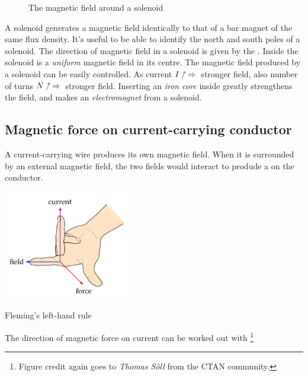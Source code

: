 \begin{figure}[htp]
	\caption{The magnetic field around a solenoid}
\end{figure}

A solenoid generates a magnetic field identically to that of a bar magnet of the same flux density. It's useful to be able to identify the north and south poles of a solenoid. The direction of magnetic field in a solenoid is given by the . Inside the solenoid is a \emph{uniform} magnetic field in its centre. The magnetic field produced by a solenoid can be easily controlled. As current $I\nnearrow \, \Rightarrow \, $ stronger field, also number of turns $N\nnearrow\, \Rightarrow \, $ stronger field. Inserting an \emph{iron core} inside greatly strengthens the field, and  makes an \emph{electromagnet} from a solenoid.



\subsection{Magnetic force on current-carrying conductor}

A current-carrying wire produces its own magnetic field. When it is surrounded by an external magnetic field, the two fields would interact to produde a  on the conductor.

\begin{marginfigure}
	\vspace*{-16pt}
	\centering
	\includegraphics[height=135pt]{left-hand.pdf}
	
	Fleming's left-hand rule
	\vspace*{-16pt}
\end{marginfigure}

The direction of magnetic force on current can be worked out with \footnote[][2cm]{Figure credit again goes to \emph{Thomas S\"{o}ll} from the CTAN community.}

